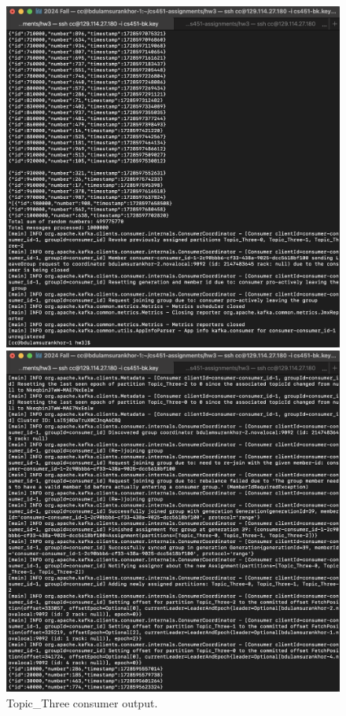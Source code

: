 \documentclass{article}
\begin{document}
\begin{enumerate}
\begin{enumerate}
    \begin{figure}[H]
      \centering
      \begin{minipage}{0.45\textwidth}
        \centering
        \includegraphics[width=1\textwidth]{image14.png}
        \caption{Topic\_Three consumer output.}
      \end{minipage}
      \begin{minipage}{0.45\textwidth}
        \centering
        \includegraphics[width=1\textwidth]{image15.png}

\end{minipage}
\end{figure}
\end{enumerate}
\end{enumerate}
\end{document}

